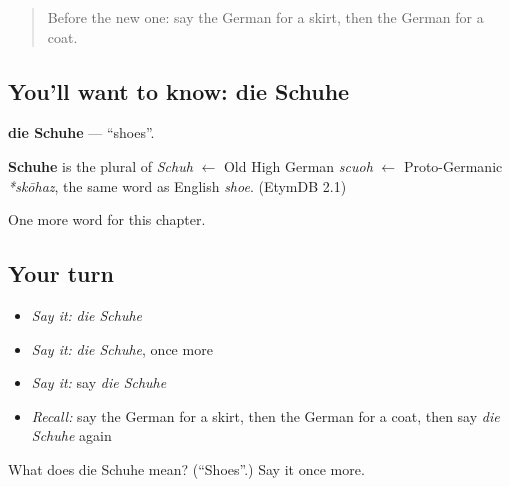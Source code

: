 \begin{quote}
Before the new one: say the German for a skirt, then the German for a coat.
\end{quote}

\subsection*{You'll want to know: die Schuhe}
\textbf{die Schuhe} — \textquotedblleft{}shoes\textquotedblright{}.

\begin{cousinweb}
\textbf{Schuhe} is the plural of \emph{Schuh} $\leftarrow$ Old High German \emph{scuoh} $\leftarrow$ Proto-Germanic \emph{*skōhaz}, the same word as English \emph{shoe}. (EtymDB 2.1)
\end{cousinweb}

\begin{grammarlens}[title={What you've built}]
One more word for this chapter.
\end{grammarlens}

\subsection*{Your turn}
\begin{itemize}
\raggedright
  \item \emph{Say it:} \emph{die Schuhe}
  \item \emph{Say it:} \emph{die Schuhe}, once more
  \item \emph{Say it:} say \emph{die Schuhe}
  \item \emph{Recall:} say the German for a skirt, then the German for a coat, then say \emph{die Schuhe} again
\end{itemize}

\begin{tcolorbox}[breakable,colback=teal!4,colframe=teal!35!black,title={Before you move on}]
What does die Schuhe mean? (\textquotedblleft{}Shoes\textquotedblright{}.) Say it once more.
\end{tcolorbox}
